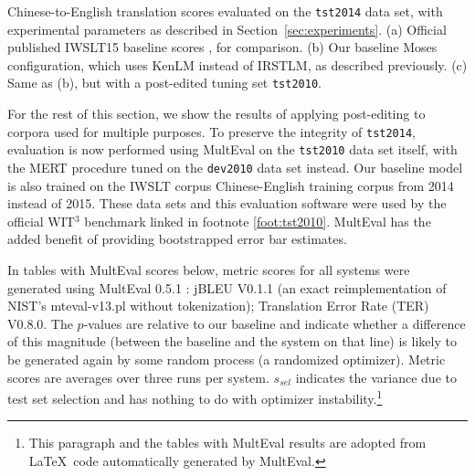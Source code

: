 {\begin{table}[ht]
\caption{ \label{tab:tst2010}
    Chinese-to-English translation scores evaluated on the {\small \tt tst2014} data set, with experimental parameters as described in Section~\ref{sec:experiments}. 
    (a) Official published IWSLT15 baseline scores , for comparison.
    (b) Our baseline Moses configuration, which uses KenLM instead of IRSTLM, as described previously.
    (c) Same as (b), but with a post-edited tuning set {\small \tt tst2010}. 
} %
\end{table}

For the rest of this section, we show the results of applying post-editing to corpora used for multiple purposes.
To preserve the integrity of {\small \tt tst2014}, evaluation is now performed using MultEval  on the {\small \tt tst2010} data set itself, with the MERT procedure tuned on the {\small \tt dev2010} data set instead.
Our baseline model is also trained on the IWSLT corpus Chinese-English training corpus from 2014 instead of 2015.
These data sets and this evaluation software were used by the official WIT$^3$ benchmark linked in footnote \ref{foot:tst2010}.
MultEval has the added benefit of providing bootstrapped error bar estimates.

In tables with MultEval scores below, metric scores for all systems were generated using MultEval 0.5.1 : jBLEU V0.1.1 (an exact reimplementation of NIST's mteval-v13.pl without tokenization); Translation Error Rate (TER) V0.8.0. 
The $p$-values are relative to our baseline and indicate whether a difference of this magnitude (between the baseline and the system on that line) is likely to be generated again by some random process (a randomized optimizer). 
Metric scores are averages over three runs per system. 
$s_{sel}$ indicates the variance due to test set selection and has nothing to do with optimizer instability.\footnote{
    This paragraph and the tables with MultEval results are adopted from \LaTeX~code automatically generated by MultEval.
}





















}
